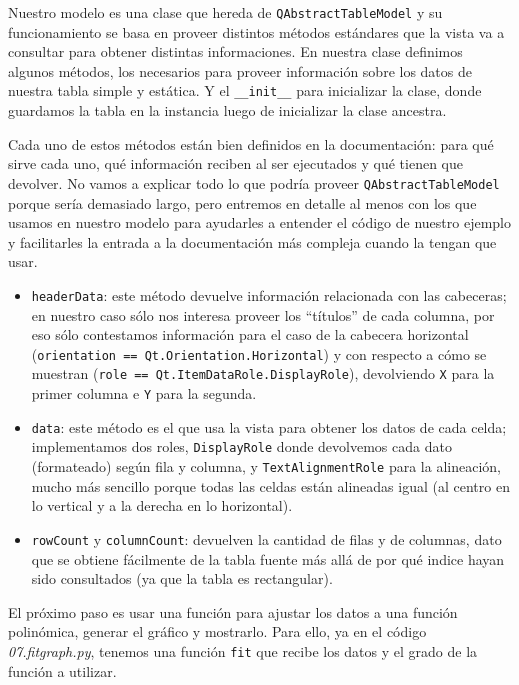 
Nuestro modelo es una clase que hereda de \texttt{QAbstractTableModel} y su funcionamiento se basa en proveer distintos métodos estándares que la vista va a consultar para obtener distintas informaciones. En nuestra clase definimos algunos métodos, los necesarios para proveer información sobre los datos de nuestra tabla simple y estática. Y el \texttt{\_\_init\_\_} para inicializar la clase, donde guardamos la tabla en la instancia luego de inicializar la clase ancestra.

Cada uno de estos métodos están bien definidos en la documentación: para qué sirve cada uno, qué información reciben al ser ejecutados y qué tienen que devolver. No vamos a explicar todo lo que podría proveer \texttt{QAbstractTableModel} porque sería demasiado largo, pero entremos en detalle al menos con los que usamos en nuestro modelo para ayudarles a entender el código de nuestro ejemplo y facilitarles la entrada a la documentación más compleja cuando la tengan que usar.

\begin{itemize}
    \item \texttt{headerData}: este método devuelve información relacionada con las cabeceras; en nuestro caso sólo nos interesa proveer los ``títulos'' de cada columna, por eso sólo contestamos información para el caso de la cabecera horizontal (\texttt{orientation == Qt.Orientation.Horizontal}) y con respecto a cómo se muestran (\texttt{role == Qt.ItemDataRole.DisplayRole}), devolviendo \texttt{X} para la primer columna e \texttt{Y} para la segunda. 
    \item \texttt{data}: este método es el que usa la vista para obtener los datos de cada celda; implementamos dos roles, \texttt{DisplayRole} donde devolvemos cada dato (formateado) según fila y columna, y \texttt{TextAlignmentRole} para la alineación, mucho más sencillo porque todas las celdas están alineadas igual (al centro en lo vertical y a la derecha en lo horizontal).
    \item \texttt{rowCount} y  \texttt{columnCount}: devuelven la cantidad de filas y de columnas, dato que se obtiene fácilmente de la tabla fuente más allá de por qué indice hayan sido consultados (ya que la tabla es rectangular).
\end{itemize}

El próximo paso es usar una función para ajustar los datos a una función polinómica, generar el gráfico y mostrarlo. Para ello, ya en el código \textit{07.fitgraph.py}, tenemos una función \texttt{fit} que recibe los datos y el grado de la función a utilizar.

